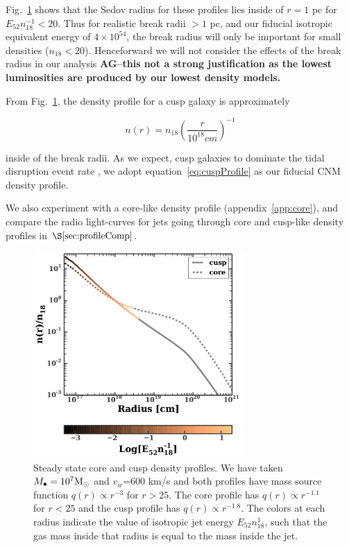 \documentclass[usenatbib,fleqn]{mnras}
\newcommand{\Mbh}[1][]{M_{\bullet#1}}
\newcommand{\Msun}{{\rm M_\odot}}
\begin{document}
Fig.~\ref{fig:profiles} shows that the Sedov radius for these profiles
lies inside of $r=1$ pc for $E_{52} n_{18}^{-1} < 20$. Thus for
realistic break radii $>1$ pc, and our fiducial isotropic equivalent
energy of $4\times 10^{54}$, the break radius will only be important
for small densities ($n_{18}<20$). Henceforward we will not consider
the effects of the break radius in our analysis {\bf AG--this not a
  strong justification as the lowest luminosities are produced by our
  lowest density models.} 

From Fig.~\ref{fig:profiles}, the density profile for a
cusp galaxy is approximately 

\begin{equation}
n(r) = n_{18} \left(\frac{r}{10^{18} cm}\right)^{-1}
\label{eq:cuspProfile}
\end{equation}

inside of the break radii. As we expect, cusp galaxies
to dominate the tidal disruption event rate \citep{Stone+2014}, we adopt
equation~\eqref{eq:cuspProfile} as our fiducial CNM density profile.

We also experiment with a core-like density profile
(appendix~\ref{app:core}), and compare the radio light-curves for jets
going through core and cusp-like density profiles in
$\S\ref{sec:profileComp}$.


\begin{figure}
\includegraphics[width=8cm]{sedov_radius.pdf}
\caption{\label{fig:profiles} Steady state core and cusp density
  profiles. We have taken $\Mbh=10^{7} \Msun$ and $v_w$=600 km/s and
  both profiles have mass source function $q(r) \propto
  r^{-3}$ for $r > 25$. The core profile has $q(r) \propto
  r^{-1.1}$ for $r < 25$ and the cusp profile has $q(r)
  \propto r^{-1.8}$.  The colors at each radius indicate the value of
  isotropic jet energy $E_{52} n_{18}^{1}$, such that the gas mass
  inside that radius is equal to the mass inside the jet. }
\end{figure}
\end{document}

